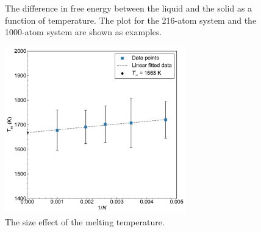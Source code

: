\documentclass{article}
\begin{document}
\begin{figure}[t]
    \centering
    \caption{The difference in free energy between the liquid and the solid as a function of temperature. The plot for the 216-atom system and the 1000-atom system are shown as examples.}
\end{figure}

\begin{figure}[h!]
    \centering
    \includegraphics[width=0.7\textwidth]{./plot/size.pdf}
    \caption{The size effect of the melting temperature.}
\end{figure}
\end{document}
